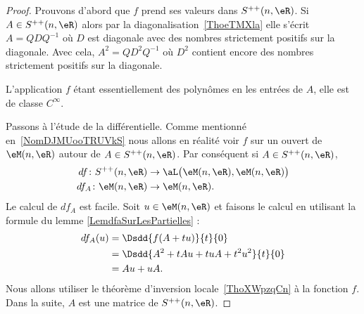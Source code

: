 \begin{proof}
	Prouvons d'abord que \( f\) prend ses valeurs dans \( S^{++}(n,\eR)\). Si \( A\in S^{++}(n,\eR)\) alors par la diagonalisation~\ref{ThoeTMXla} elle s'écrit \( A=QDQ^{-1}\) où \( D\) est diagonale avec des nombres strictement positifs sur la diagonale. Avec cela, \( A^2=QD^2Q^{-1}\) où \( D^2\) contient encore des nombres strictement positifs sur la diagonale.

	L'application \( f\) étant essentiellement des polynômes en les entrées de \( A\), elle est de classe \( C^{\infty}\).

	Passons à l'étude de la différentielle. Comme mentionné en~\ref{NomDJMUooTRUVkS} nous allons en réalité voir \( f\) sur un ouvert de \( \eM(n,\eR)\) autour de \( A\in S^{++}(n,\eR)\). Par conséquent si \( A\in S^{++}(n,\eR)\),
	\begin{subequations}
		\begin{align}
			df\colon S^{++}(n,\eR) & \to \aL\big( \eM(n,\eR),\eM(n,\eR) \big) \\
			df_A\colon \eM(n,\eR)  & \to \eM(n,\eR).
		\end{align}
	\end{subequations}
	Le calcul de \( df_A\) est facile. Soit \( u\in \eM(n,\eR)\) et faisons le calcul en utilisant la formule du lemme \eqref{LemdfaSurLesPartielles} :
	\begin{subequations}
		\begin{align}
			df_A(u) & = \Dsdd{ f(A+tu) }{t}{0}            \\
			        & = \Dsdd{ A^2+tAu+tuA+t^2u^2 }{t}{0} \\
			        & = Au+uA.
		\end{align}
	\end{subequations}
	Nous allons utiliser le théorème d'inversion locale~\ref{ThoXWpzqCn} à la fonction \( f\). Dans la suite, \( A\) est une matrice de \( S^{++}(n,\eR)\).


\end{proof}
